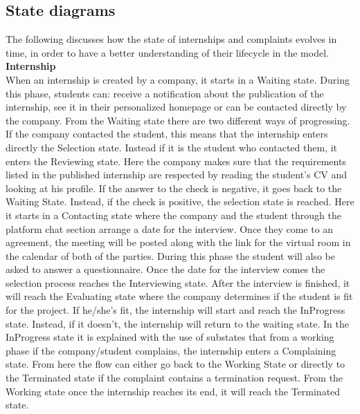 \subsection{State diagrams}
The following discusses how the state of internships and complaints evolves in time, in order to have a better understanding of their lifecycle in the model.\\
\textbf{Internship}\\
When an internship is created by a company, it starts in a Waiting state. During this phase, students can: receive a notification about the publication of the internship, see it in their personalized homepage or can be contacted directly by the company. From the Waiting state there are two different ways of progressing. If the company contacted the student, this means that the internship enters directly the Selection state. Instead if it is the student who contacted them, it enters the Reviewing state. Here the company makes sure that the requirements listed in the published internship are respected by reading the student's CV and looking at his profile. If the answer to the check is negative, it goes back to the Waiting State. Instead, if the check is positive, the selection state is reached. Here it starts in a Contacting state where the company and the student through the platform chat section arrange a date for the interview. Once they come to an agreement, the meeting will be posted along with the link for the virtual room in the calendar of both of the parties. During this phase the student will also be asked to answer a questionnaire. Once the date for the interview comes the selection process reaches the Interviewing state. After the interview is finished, it will reach the Evaluating state where the company determines if the student is fit for the project. If he/she's fit, the internship will start and reach the InProgress state. Instead, if it doesn't, the internship will return to the waiting state. In the InProgress state it is explained with the use of substates that from a working phase if the company/student complains, the internship enters a Complaining state. From here the flow can either go back to the Working State or directly to the Terminated state if the complaint contains a termination request. From the Working state once the internship reaches its end, it will reach the Terminated state.\\
